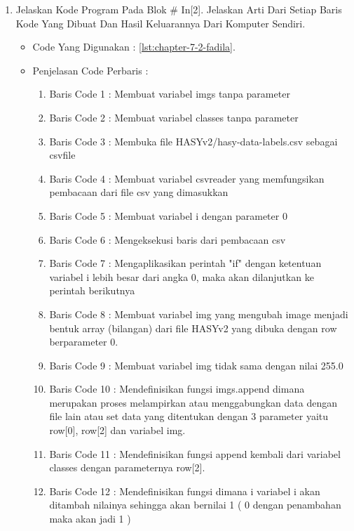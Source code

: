 \begin{enumerate}
\par
\item Jelaskan Kode Program Pada Blok \# In[2]. Jelaskan Arti Dari Setiap Baris Kode Yang Dibuat Dan Hasil Keluarannya Dari Komputer Sendiri.
\begin{itemize}
\item Code Yang Digunakan : \ref{lst:chapter-7-2-fadila}.

\par
\par
\item Penjelasan Code Perbaris	: 
\begin{enumerate}
\item Baris Code 1	: Membuat variabel imgs tanpa parameter
\item Baris Code 2	: Membuat variabel classes tanpa parameter
\item Baris Code 3	: Membuka file HASYv2/hasy-data-labels.csv sebagai csvfile
\item Baris Code 4	: Membuat variabel csvreader yang memfungsikan pembacaan dari file csv yang dimasukkan
\item Baris Code 5	: Membuat variabel i dengan parameter 0
\item Baris Code 6	: Mengeksekusi baris dari pembacaan csv 
\item Baris Code 7	: Mengaplikasikan perintah "if" dengan ketentuan variabel i lebih besar dari angka 0, maka akan dilanjutkan ke perintah berikutnya
\item Baris Code 8	: Membuat variabel img yang mengubah image menjadi bentuk array (bilangan) dari file HASYv2 yang dibuka dengan row berparameter 0.
\item Baris Code 9	: Membuat variabel img tidak sama dengan nilai 255.0
\item Baris Code 10	: Mendefinisikan fungsi imgs.append dimana merupakan proses melampirkan atau menggabungkan data dengan file lain atau set data yang ditentukan dengan 3 parameter yaitu row[0], row[2] dan variabel img.
\item Baris Code 11	: Mendefinisikan fungsi append kembali dari variabel classes dengan parameternya row[2].
\item Baris Code 12	: Mendefinisikan fungsi dimana i variabel i akan ditambah nilainya sehingga akan bernilai 1 ( 0 dengan penambahan maka akan jadi 1 )
\end{enumerate}
\par

\end{itemize}
\end{enumerate}
